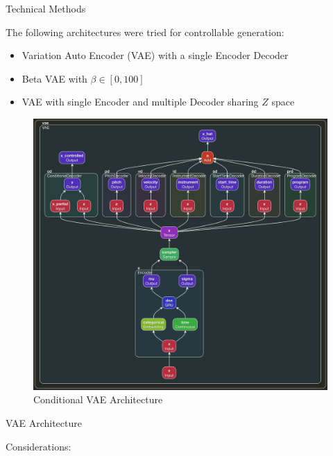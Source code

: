 \documentclass[final]{beamer}
\newlength{\onecolwid}
\newlength{\twocolwid}
\begin{document}
\begin{frame}[t]
\begin{columns}[t]
\begin{column}{\twocolwid}
\begin{columns}[t,totalwidth=\twocolwid]
\begin{column}{\onecolwid}



\begin{block}{Technical Methods}

The following architectures were tried for controllable generation:

\begin{itemize}
\item Variation Auto Encoder (VAE) with a single Encoder Decoder
\item Beta VAE with $\beta \in [0, 100]$
\item VAE with single Encoder and multiple Decoder sharing $Z$ space
\end{itemize}

\begin{figure}
\includegraphics[width=20cm]{midi_vae.png}
\caption{Conditional VAE Architecture}
\end{figure}

\end{block}


\begin{block}{VAE Architecture}

Considerations:


\end{block}
\end{column}
\end{columns}
\end{column}
\end{columns}
\end{frame}
\end{document}

